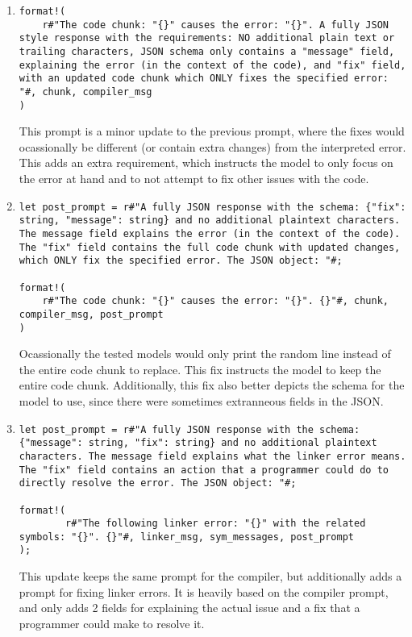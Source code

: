 \documentclass{article}
\begin{document}
\begin{enumerate}
			\item
			\begin{verbatim}
format!(
	r#"The code chunk: "{}" causes the error: "{}". A fully JSON style response with the requirements: NO additional plain text or trailing characters, JSON schema only contains a "message" field, explaining the error (in the context of the code), and "fix" field, with an updated code chunk which ONLY fixes the specified error: "#, chunk, compiler_msg
)
			\end{verbatim}
			This prompt is a minor update to the previous prompt, where the fixes would ocassionally be different (or contain extra changes) from the interpreted error. This adds an extra requirement, which instructs the model to only focus on the error at hand and to not attempt to fix other issues with the code.

			\item
			\begin{verbatim}
let post_prompt = r#"A fully JSON response with the schema: {"fix": string, "message": string} and no additional plaintext characters. The message field explains the error (in the context of the code). The "fix" field contains the full code chunk with updated changes, which ONLY fix the specified error. The JSON object: "#;

format!(
	r#"The code chunk: "{}" causes the error: "{}". {}"#, chunk, compiler_msg, post_prompt
)
			\end{verbatim}
			Ocassionally the tested models would only print the random line instead of the entire code chunk to replace. This fix instructs the model to keep the entire code chunk. Additionally, this fix also better depicts the schema for the model to use, since there were sometimes extranneous fields in the JSON.

			\item
			\begin{verbatim}
let post_prompt = r#"A fully JSON response with the schema: {"message": string, "fix": string} and no additional plaintext characters. The message field explains what the linker error means. The "fix" field contains an action that a programmer could do to directly resolve the error. The JSON object: "#;

format!(
        r#"The following linker error: "{}" with the related symbols: "{}". {}"#, linker_msg, sym_messages, post_prompt
);
			\end{verbatim}
			This update keeps the same prompt for the compiler, but additionally adds a prompt for fixing linker errors. It is heavily based on the compiler prompt, and only adds 2 fields for explaining the actual issue and a fix that a programmer could make to resolve it.
		\end{enumerate}
\end{document}
